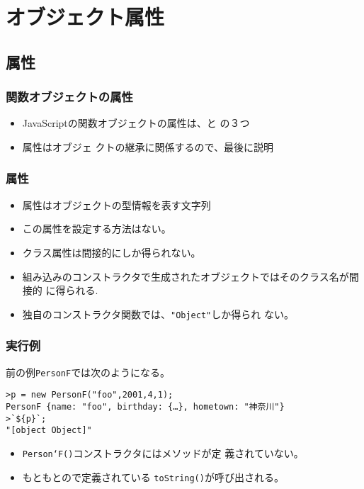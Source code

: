 \section{オブジェクト属性}
\subsection{\protect{}属性}
\begin{frame}[containsverbatim]
 \frametitle{関数オブジェクトの属性}
 \begin{itemize}
  \item JavaScriptの関数オブジェクトの属性は、と
の３つ
  \item {}属性はオブジェ
クトの継承に関係するので、最後に説明
 \end{itemize}
\end{frame}
\begin{frame}[containsverbatim]
 \frametitle{\protect{}属性}
 \begin{itemize}
  \item {}属性はオブジェクトの型情報を表す文字列
  \item この属性を設定する方法はない。
  \item クラス属性は間接的にしか得られない。
  \item 組み込みのコンストラクタで生成されたオブジェクトではそのクラス名が間接的
        に得られる.
  \item 独自のコンストラクタ関数では、\texttt{"Object"}しか得られ
ない。
 \end{itemize}
\end{frame}
\begin{frame}[containsverbatim]
 \frametitle{実行例}
 前の例\texttt{PersonF}では次のようになる。
 \begin{Verbatim}
>p = new PersonF("foo",2001,4,1);
PersonF {name: "foo", birthday: {…}, hometown: "神奈川"}
>`${p}`;
"[object Object]"
\end{Verbatim}
\begin{itemize}
 \item \texttt{Person`F()}コンストラクタにはメソッドが定
       義されていない。
 \item もともとので定義されている
 \texttt{toString()}が呼び出される。
\end{itemize}
\end{frame}
